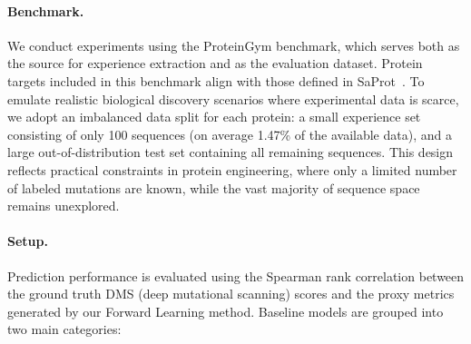 \documentclass{article}
\newcommand{\method}{Forward Learning}
\begin{document}






\paragraph{Benchmark.} We conduct experiments using the ProteinGym benchmark, which serves both as the source for experience extraction and as the evaluation dataset. Protein targets included in this benchmark align with those defined in SaProt~\cite{su2023saprot}. To emulate realistic biological discovery scenarios where experimental data is scarce, we adopt an imbalanced data split for each protein: a small experience set consisting of only 100 sequences (on average 1.47\% of the available data), and a large out-of-distribution test set containing all remaining sequences. This design reflects practical constraints in protein engineering, where only a limited number of labeled mutations are known, while the vast majority of sequence space remains unexplored.





\paragraph{Setup.} Prediction performance is evaluated using the Spearman rank correlation between the ground truth DMS (deep mutational scanning) scores and the proxy metrics generated by our \method{} method. Baseline models are grouped into two main categories:
\end{document}
